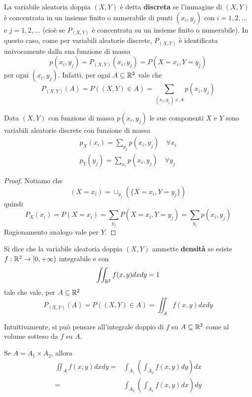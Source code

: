 \begin{definition}
	La variabile aleatoria doppia $(X,Y)$ è detta \textbf{discreta} se l'immagine di $(X,Y)$ è
	concentrata in un insieme finito o numerabile di punti $(x_i, y_j)$ con $i = 1,2,\dots$ e
	$j = 1,2,\dots$ (cioè se $P_{(X,Y)}$ è concentrata su un insieme finito o numerabile). In
	questo caso, come per variabili aleatorie discrete, $P_{(X,Y)}$ è identificata univocamente
	dalla sua funzione di massa
	\[ p(x_i, y_j) = P_{(X,Y)} (x_i, y_j) = P(X = x_i, Y = y_j) \]
	per ogni $(x_i, y_j)$. Infatti, per ogni $A \subseteq \mathbb{R}^2$ vale che
	\[ P_{(X,Y)} (A) = P((X,Y) \in A) = \sum_{(x_i, y_j) \in A} p(x_i, y_j) \]
\end{definition}

\begin{proposition}
	Data $(X, Y)$ con funzione di massa $p(x_i, y_j)$ le sue componenti $X$ e $Y$ sono variabili
	aleatorie discrete con funzione di massa
	\begin{gather*}
		p_X(x_i) = \sum_{y_j} p (x_i, y_j) \quad \forall x_i \\
		p_Y(y_j) = \sum_{x_i} p (x_i, y_j) \quad \forall y_j
	\end{gather*}
	\begin{proof}
		Notiamo che
		\[ (X = x_i) = \cup_{y_j} (\{ X = x_i, Y = y_j \}) \]
		quindi
		\[ P_X(x_i) = P(X = x_i) = \sum_{y_j} P(X = x_i, Y = y_j) = \sum_{y_j} p(x_i, y_j) \]
		Ragionamento analogo vale per $Y$.
	\end{proof}
\end{proposition}

\begin{definition}
	Si dice che la variabile aleatoria doppia $(X,Y)$ ammette \textbf{densità} se esiste
	$f : \mathbb{R}^2 \to [0, +\infty)$ integrabile e con
	\[ \iint_{\mathbb{R}^2} f(x,y) dx dy = 1 \]
	tale che vale, per $A \subseteq \mathbb{R}^2$
	\[ P_{(X,Y)} (A) = P((X,Y) \in A) = \iint_A f(x,y) dx dy \]
\end{definition}

Intuitivamente, si può pensare all'integrale doppio di $f$ su $A \subseteq \mathbb{R}^2$ come al volume
sotteso da $f$ su $A$.

\begin{theorem}
	Se $A = A_1 \times A_2$, allora
	\begin{align*}
		\iint_A f(x,y) dx dy = & \int_{A_1} \left( \int_{A_2} f(x,y) dy \right) dx \\
		=                      & \int_{A_2} \left( \int_{A_1} f(x,y) dx \right) dy
	\end{align*}
\end{theorem}

